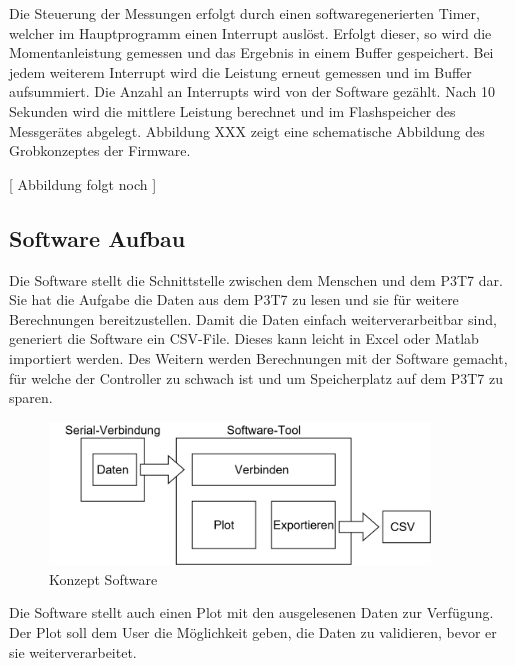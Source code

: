 Die Steuerung der Messungen erfolgt durch einen softwaregenerierten Timer, welcher im Hauptprogramm einen Interrupt auslöst. Erfolgt dieser, so wird die Momentanleistung gemessen und das Ergebnis in einem Buffer gespeichert. Bei jedem weiterem Interrupt wird die Leistung erneut gemessen und im Buffer aufsummiert. Die Anzahl an Interrupts wird von der Software gezählt. Nach 10 Sekunden wird die mittlere Leistung berechnet und im Flashspeicher des Messgerätes abgelegt. Abbildung XXX zeigt eine schematische Abbildung des Grobkonzeptes der Firmware.

[ Abbildung folgt noch ] 

\subsection{Software Aufbau}
Die Software stellt die Schnittstelle zwischen dem Menschen und dem P3T7 dar. Sie hat die Aufgabe die Daten aus dem P3T7 zu lesen und sie für weitere Berechnungen bereitzustellen. Damit die Daten einfach weiterverarbeitbar sind, generiert die Software ein CSV-File. Dieses kann leicht in Excel oder Matlab importiert werden. Des Weitern werden Berechnungen mit der Software gemacht, für welche der Controller zu schwach ist und um Speicherplatz auf dem P3T7 zu sparen.

\begin{figure}[H]
\begin{center}
\includegraphics[width=0.9\textwidth]{images/Konzept_Software.png}
\caption{Konzept Software}
\end{center}
\end{figure}

Die Software stellt auch einen Plot mit den ausgelesenen Daten zur Verfügung. Der Plot soll dem User die Möglichkeit geben, die Daten zu validieren, bevor er sie weiterverarbeitet.
